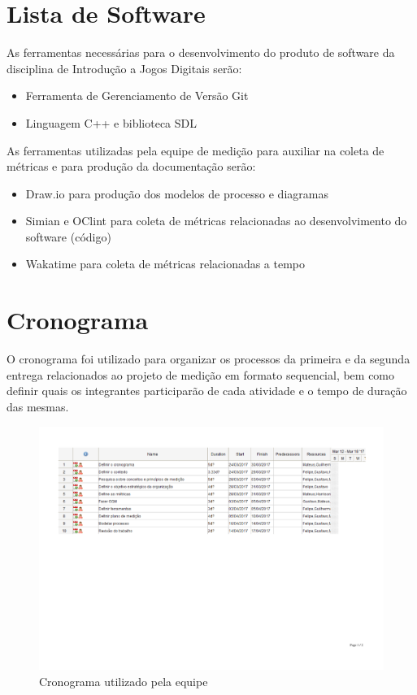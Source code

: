\section{Lista de Software}
	As ferramentas necessárias para o desenvolvimento do produto de software da disciplina de Introdução a Jogos Digitais serão: 
	\begin{itemize}
		\item Ferramenta de Gerenciamento de Versão Git
		\item Linguagem C++ e biblioteca SDL
	\end{itemize}
	
	As ferramentas utilizadas pela equipe de medição para auxiliar na coleta de métricas e para produção da documentação serão:
	
	\begin{itemize}
		\item Draw.io para produção dos modelos de processo e diagramas
		\item Simian e OClint para coleta de métricas relacionadas ao desenvolvimento do software (código)
		\item Wakatime para coleta de métricas relacionadas a tempo
	\end{itemize}
	
\section{Cronograma}
	O cronograma foi utilizado para organizar os processos da primeira e da segunda entrega relacionados ao projeto de medição em formato sequencial, bem como definir quais os integrantes participarão de cada atividade e o tempo de duração das mesmas.
	\begin{figure}[!htpb]
		\centering
		\includegraphics [scale=0.35]{figuras/processo/cronograma}
		\caption{Cronograma utilizado pela equipe}
	\end{figure}
	\newpage
